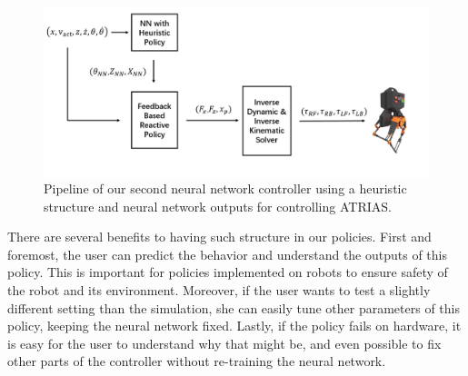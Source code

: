 \begin{figure}[!h]
	\centering
	\includegraphics[width=.7\textwidth]{./img/Heuristic.PNG}
    \caption{Pipeline of our second neural network controller using a heuristic structure and neural network outputs for controlling ATRIAS. }
    \label{fig:H_process}
\end{figure}

There are several benefits to having such structure in our policies. First and foremost, the user can predict the behavior and understand the outputs of this policy. This is important for policies implemented on robots to ensure safety of the robot and its environment. 
Moreover, if the user wants to test a slightly different setting than the simulation, she can easily tune other parameters of this policy, keeping the neural network fixed. Lastly, if the policy fails on hardware, it is easy for the user to understand why that might be, and even possible to fix other parts of the controller without re-training the neural network.

